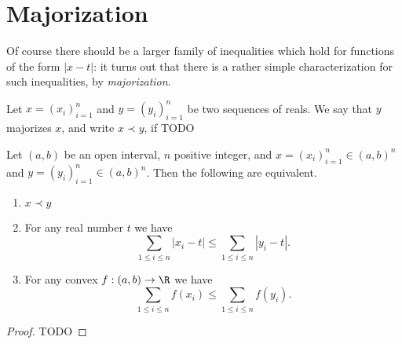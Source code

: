 \section{Majorization}

Of course there should be a larger family of inequalities which hold for functions of the form $|x - t|$: it turns out that there is a rather simple characterization for such inequalities, by \textit{majorization}.

\begin{maar}
	Let $x = (x_{i})_{i = 1}^{n}$ and $y = (y_{i})_{i = 1}^{n}$ be two sequences of reals. We say that $y$ majorizes $x$, and write $x \prec y$, if TODO
\end{maar}

\begin{lause}
	Let $(a, b)$ be an open interval, $n$ positive integer, and $x = (x_{i})_{i = 1}^{n} \in (a, b)^{n}$ and $y = (y_{i})_{i = 1}^{n} \in (a, b)^{n}$. Then the following are equivalent.
	\begin{enumerate}
		\item $x \prec y$
		\item For any real number $t$ we have
		\[
			\sum_{1 \leq i \leq n} |x_{i} - t| \leq \sum_{1 \leq i \leq n} |y_{i} - t|.
		\]
		\item For any convex $f : (a, b) \to \R$ we have
		\[
			\sum_{1 \leq i \leq n} f(x_{i}) \leq \sum_{1 \leq i \leq n} f(y_{i}).
		\]
	\end{enumerate}
\end{lause}
\begin{proof}
	TODO
\end{proof}